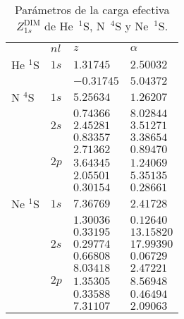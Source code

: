 \begin{table}[t]
\begin{center}
\begin{tabularx}{\textwidth}{
>{\centering\arraybackslash}p{}
>{\centering\arraybackslash}p{}
>{\centering\arraybackslash}p{}
>{\centering\arraybackslash}p{}}
\rowcolor{mydarkgray} 
         & $nl$ & $z$        & $\alpha$   \\
He $^1$S & $1s$ &  $1.31745$ & $2.50032$  \\ 
\rowcolor{mygray} 
         &      & $-0.31745$ & $5.04372$  \\ 
N $^4$S  & $1s$ & $5.25634$  & $1.26207$  \\ 
\rowcolor{mygray} 
         &      & $0.74366$ & $8.02844$  \\ 
         & $2s$ & $2.45281$  & $3.51271$  \\ 
\rowcolor{mygray} 
         &      & $0.83357$ & $3.38654$  \\ 
         &      & $2.71362$  & $0.89470$ \\ 
\rowcolor{mygray} 
         & $2p$ & $3.64345$  & $1.24069$  \\ 
         &      & $2.05501$  & $5.35135$  \\ 
\rowcolor{mygray} 
         &      & $0.30154$ & $0.28661$ \\
Ne $^1$S & $1s$ & $7.36769$ & $2.41728$ \\
\rowcolor{mygray} 
         &      & $1.30036$ & $0.12640$ \\
         &      & $0.33195$ & $13.15820$ \\
\rowcolor{mygray} 
         & $2s$ & $0.29774$ & $17.99390$ \\
         &      & $0.66808$ & $0.06729$ \\
\rowcolor{mygray} 
         &      & $8.03418$  & $2.47221$ \\
         & $2p$ & $1.35305$ & $8.56948$ \\
\rowcolor{mygray} 
         &      & $0.33588$ & $0.46494$ \\
         &      & $7.31107$ & $2.09063$ \\
\end{tabularx}
\caption[Parámetros de la carga efectiva de He, N y Ne.]
{Parámetros de la carga efectiva $Z_{1s}^{\mathrm{ DIM}}$ de He~$^1$S, 
N~$^4$S y Ne~$^1$S.}
\label{tab:params-atoms}
\end{center}
\end{table}
